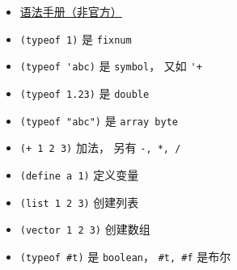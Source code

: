 
\begin{itemize}
\item \href{https://code.google.com/archive/p/femtolisp/wikis/Manual.wiki}{语法手册（非官方）}
\item \verb`(typeof 1)` 是 \verb`fixnum`
\item \verb`(typeof 'abc)` 是 \verb`symbol`， 又如 \verb`'+`
\item \verb`(typeof 1.23)` 是 \verb`double`
\item \verb`(typeof "abc")` 是 \verb`array byte`
\item \verb`(+ 1 2 3)` 加法， 另有 \verb`-, *, /`
\item \verb`(define a 1)` 定义变量
\item \verb`(list 1 2 3)` 创建列表
\item \verb`(vector 1 2 3)` 创建数组
\item \verb`(typeof #t)` 是 \verb`boolean`， \verb`#t, #f` 是布尔
\end{itemize}

